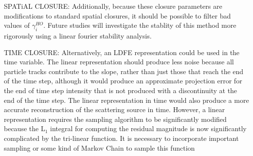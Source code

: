 SPATiAL CLOSURE:
Additionally, because these closure
parameters are modifications to standard spatial closures, it should be possible to filter bad
values of $\gamma^{HO}_i$.  Future studies will investigate the stablity of
this method more rigorously using a linear fourier stability analysis.

TIME CLOSURE:
Alternatively, an LDFE representation could be used in the time
variable. The linear representation should produce less noise because all particle tracks
contribute to the slope, rather than just those that reach the end of the time step,
although it would produce an approximate projection error for the end of time step
intensity that is not produced with a discontinuity at the end of the time step.  The
linear representation in time would also produce a more accurate reconstruction of the
scattering source in time.  However, a linear representation requires the sampling
algorithm to be significantly modified because the L$_1$ integral for computing the
residual magnitude is now significantly complicated by the tri-linear function.  It is
necessary to incorporate important sampling or some kind of Markov Chain to sample this
function~\cite{shultis_mc}


